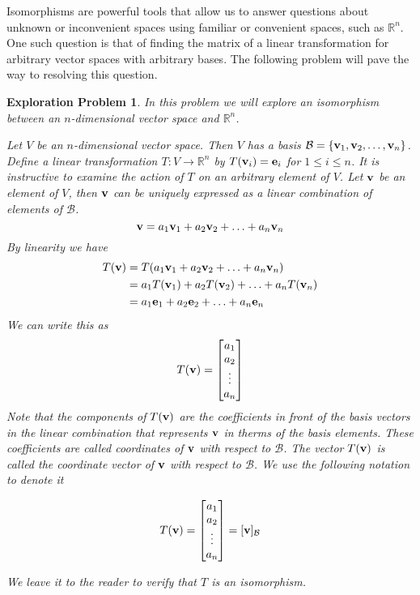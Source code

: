 \documentclass{ximera}
\renewcommand{\vec}[1]{{\bf #1}}
\newcommand{\RR}{\mathbb{R}}
\newcommand{\dfn}{\textit}
\newtheorem{initprob}{Exploration Problem}
\begin{document}
Isomorphisms are powerful tools that allow us to answer questions about unknown or inconvenient spaces using familiar or convenient spaces, such as $\RR^n$.  One such question is that of finding the matrix of a linear transformation for arbitrary vector spaces with arbitrary bases.  The following problem will pave the way to resolving this question. 


\begin{initprob}\label{init:coordmapping} In this problem we will explore an isomorphism between an $n$-dimensional vector space and $\RR^n$.

Let $V$ be an $n$-dimensional vector space.  Then $V$ has a basis $\mathcal{B}=\{\vec{v}_1, \vec{v}_2,\ldots ,\vec{v}_n\}$.  Define a linear transformation $T:V\rightarrow \RR^n$ by $T(\vec{v}_i)=\vec{e}_i$ for $1\leq i\leq n$.
It is instructive to examine the action of $T$ on an arbitrary element of $V$.  Let $\vec{v}$ be an element of $V$, then $\vec{v}$ can be uniquely expressed as a linear combination of elements of $\mathcal{B}$.
$$\vec{v}=a_1\vec{v}_1+a_2\vec{v}_2+\ldots +a_n\vec{v}_n$$
By linearity we have
\begin{align*}
T(\vec{v})&=T(a_1\vec{v}_1+a_2\vec{v}_2+\ldots +a_n\vec{v}_n)\\
&=a_1T(\vec{v}_1)+a_2T(\vec{v}_2)+\ldots +a_nT(\vec{v}_n)\\
&=a_1\vec{e}_1+a_2\vec{e}_2+\ldots +a_n\vec{e}_n
\end{align*}
We can write this as $$T(\vec{v})=\begin{bmatrix}a_1\\a_2\\\vdots\\a_n\end{bmatrix}$$
Note that the components of $T(\vec{v})$ are the coefficients in front of the basis vectors in the linear combination that represents $\vec{v}$ in therms of the basis elements.  These coefficients are called \dfn{coordinates of $\vec{v}$ with respect to $\mathcal{B}$}.  The vector $T(\vec{v})$  is called the \dfn{coordinate vector of $\vec{v}$ with respect to $\mathcal{B}$}. We use the following notation to denote it

$$T(\vec{v})=\begin{bmatrix}a_1\\a_2\\\vdots\\a_n\end{bmatrix}=[\vec{v}]_{\mathcal{B}}$$

We leave it to the reader to verify that $T$ is an isomorphism.

\end{initprob}
\end{document}
